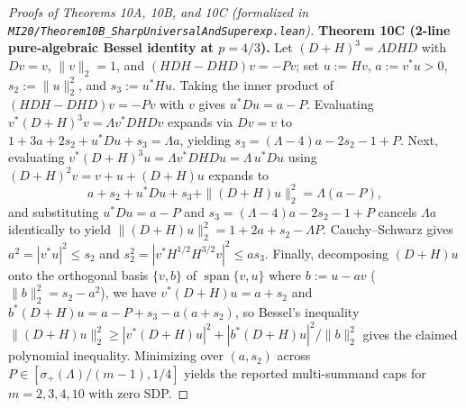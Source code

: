 \documentclass[10pt,letterpaper]{article}
\begin{document}
\begin{proof}[Proofs of Theorems 10A, 10B, and 10C (formalized in \texttt{MI20/Theorem10B\_\allowbreak SharpUniversalAndSuperexp.lean})]
\textbf{Theorem 10C (2-line pure-algebraic Bessel identity at $p = 4/3$).}
Let $(D+H)^3 = \Lambda D H D$ with $Dv = v$, $\|v\|_2 = 1$, and $(HDH - DHD)v = -Pv$; set $u := Hv$, $a := v^* u > 0$, $s_2 := \|u\|_2^2$, and $s_3 := u^* H u$. Taking the inner product of $(HDH - DHD)v = -Pv$ with $v$ gives $u^* D u = a - P$. Evaluating $v^*(D+H)^3 v = \Lambda v^* D H D v$ expands via $Dv = v$ to $1 + 3a + 2s_2 + u^* D u + s_3 = \Lambda a$, yielding $s_3 = (\Lambda - 4)a - 2s_2 - 1 + P$. Next, evaluating $v^*(D+H)^3 u = \Lambda v^* D H D u = \Lambda\, u^* D u$ using $(D+H)^2 v = v + u + (D+H)u$ expands to
\[
  a + s_2 + u^* D u + s_3 + \|(D+H)u\|_2^2 = \Lambda(a - P),
\]
and substituting $u^* D u = a - P$ and $s_3 = (\Lambda - 4)a - 2s_2 - 1 + P$ cancels $\Lambda a$ identically to yield $\|(D+H)u\|_2^2 = 1 + 2a + s_2 - \Lambda P$. Cauchy--Schwarz gives $a^2 = |v^* u|^2 \le s_2$ and $s_2^2 = |v^* H^{1/2} H^{3/2} v|^2 \le a s_3$. Finally, decomposing $(D+H)u$ onto the orthogonal basis $\{v, b\}$ of $\operatorname{span}\{v, u\}$ where $b := u - av$ ($\|b\|_2^2 = s_2 - a^2$), we have $v^*(D+H)u = a + s_2$ and $b^*(D+H)u = a - P + s_3 - a(a + s_2)$, so Bessel's inequality $\|(D+H)u\|_2^2 \ge |v^*(D+H)u|^2 + |b^*(D+H)u|^2 / \|b\|_2^2$ gives the claimed polynomial inequality. Minimizing over $(a, s_2)$ across $P \in [\sigma_+(\Lambda)/(m-1), 1/4]$ yields the reported multi-summand caps for $m = 2, 3, 4, 10$ with zero SDP.
\end{proof}
\end{document}
